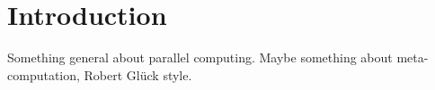 \chapter{Introduction}

Something general about parallel computing. Maybe something about meta-computation, Robert Glück style.
